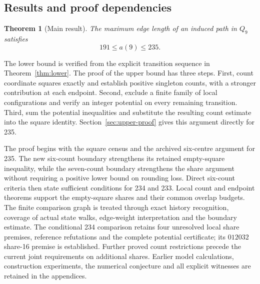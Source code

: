 \documentclass[11pt,a4paper]{article}
\newtheorem{theorem}{Theorem}[section]
\theoremstyle{definition}
\theoremstyle{remark}
\newcommand{\Q}{Q}
\begin{document}
\subsection{Results and proof dependencies}
\begin{theorem}[Main result]\label{thm:main}
The maximum edge length of an induced path in $\Q_9$ satisfies
\[
\boxed{191\le a(9)\le235.}
\]
\end{theorem}
The lower bound is verified from the explicit transition sequence in Theorem~\ref{thm:lower}. The proof of the upper bound has three steps. First, count coordinate squares exactly and establish positive singleton counts, with a stronger contribution at each endpoint. Second, exclude a finite family of local configurations and verify an integer potential on every remaining transition. Third, sum the potential inequalities and substitute the resulting count estimate into the square identity. Section~\ref{sec:upper-proof} gives this argument directly for 235.

The proof begins with the square census and the archived six-centre argument
for 235. The new six-count boundary strengthens its retained empty-square
inequality, while the seven-count boundary strengthens the share argument
without requiring a positive lower bound on rounding loss. Direct six-count criteria then state sufficient conditions for
234 and 233. Local count and endpoint theorems support the empty-square
shares and their common overlap budgets. The finite comparison graph is
treated through exact history recognition, coverage of actual state walks,
edge-weight interpretation and the boundary estimate. The conditional 234
comparison retains four unresolved local share premises, reference
refutations and the complete potential certificate; its $012032$ share-16
premise is established. Further proved count restrictions precede
the current joint requirements on additional shares. Earlier model
calculations, construction experiments, the numerical conjecture and all
explicit witnesses are retained in the appendices.
\end{document}
